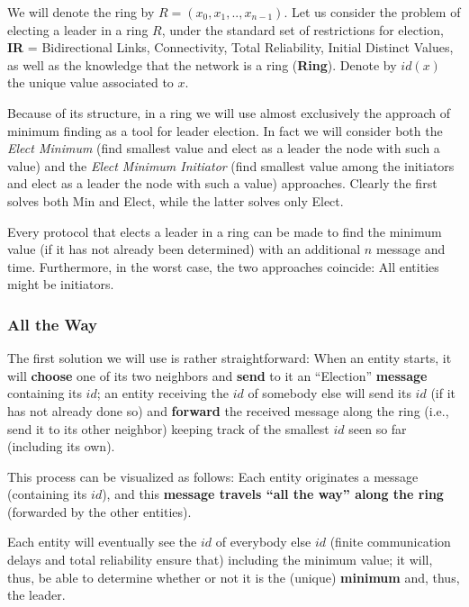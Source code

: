 We will denote the ring by $R = (x_0,x_1, .., x_{n-1})$. Let us consider the problem of electing a leader in a ring $R$, under the standard set of restrictions for election, \textbf{IR} = {Bidirectional Links, Connectivity, Total Reliability, Initial Distinct Values}, as well as the knowledge that the network is a ring (\textbf{Ring}). Denote by $id(x)$ the unique value associated to $x$. 

Because of its structure, in a ring we will use almost exclusively the approach of minimum finding as a tool for leader election. In fact we will consider both the \textit{Elect Minimum} (find smallest value and elect as a leader the node with such a value) and the \textit{Elect Minimum Initiator} (find smallest value among the initiators and elect as a leader the node with such a value) approaches. Clearly the first solves both Min and Elect, while the latter solves only Elect.

Every protocol that elects a leader in a ring can be made to find the minimum value (if it has not already been determined) with an additional $n$ message and time. Furthermore, in the worst case, the two approaches coincide: All entities might be initiators.

\subsubsection{All the Way}
The first solution we will use is rather straightforward: When an entity starts, it will \textbf{choose} one of its two neighbors and \textbf{send} to it an “Election” \textbf{message} containing its $id$; an entity receiving the $id$ of somebody else will send its $id$ (if it has not already done so) and \textbf{forward} the received message along the ring (i.e., send it to its other neighbor) keeping track of the smallest $id$ seen so far (including its own).

This process can be visualized as follows: Each entity originates a message (containing its $id$), and this \textbf{message travels “all the way” along the ring} (forwarded by the other entities). 


Each entity will eventually see the $id$ of everybody else $id$ (finite communication delays and total reliability ensure that) including the minimum value; it will, thus, be able to determine whether or not it is the (unique) \textbf{minimum} and, thus, the leader. 

